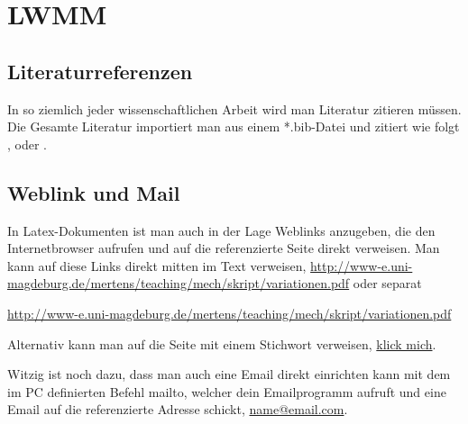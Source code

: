 
\chapter{LWMM}


\section{Literaturreferenzen}

In so ziemlich jeder wissenschaftlichen Arbeit wird man Literatur zitieren müssen. Die Gesamte Literatur importiert man aus einem *.bib-Datei und zitiert wie folgt \citep{Adams.2002}, \cite{Adams.2002,Adams.2004} oder \citep[siehe, z.B.,][]{Fullwood.2010}.


\section{Weblink und Mail}

In Latex-Dokumenten ist man auch in der Lage Weblinks anzugeben, die den Internetbrowser aufrufen und auf die referenzierte Seite direkt verweisen. Man kann auf diese Links direkt mitten im Text verweisen, \url{http://www-e.uni-magdeburg.de/mertens/teaching/mech/skript/variationen.pdf} oder separat
\begin{center}
	\url{http://www-e.uni-magdeburg.de/mertens/teaching/mech/skript/variationen.pdf}
\end{center}
Alternativ kann man auf die Seite mit einem Stichwort verweisen, \href{http://www-e.uni-magdeburg.de/mertens/teaching/mech/skript/variationen.pdf}{klick mich}.

Witzig ist noch dazu, dass man auch eine Email direkt einrichten kann mit dem im PC definierten Befehl mailto, welcher dein Emailprogramm aufruft und eine Email auf die referenzierte Adresse schickt, \href{mailto:name@email.com}{name@email.com}.



